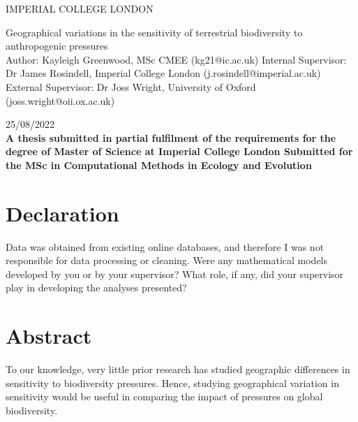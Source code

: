 \documentclass[11pt, a4paper, titlepage]{article}
\begin{document}
    \begin{titlepage}
    \begin{center}
            {\large IMPERIAL COLLEGE LONDON}
    \end{center}
    
    \vspace*{\fill}
    
    \begin{center}
        {\Huge 
    	 Geographical variations in the sensitivity of terrestrial biodiversity to anthropogenic pressures}
        \\[2in]
        Author: Kayleigh Greenwood, MSc CMEE (kg21@ic.ac.uk)
        \bigskip
        \newline
       Internal Supervisor: Dr James Rosindell, Imperial College London (j.rosindell@imperial.ac.uk)
       \bigskip
       \newline
        External Supervisor: Dr Joss Wright, University of Oxford (joss.wright@oii.ox.ac.uk)
        \bigskip
        \newline

        25/08/2022
        \\[2in]
        
        {\bfseries A thesis submitted in partial fulfilment of the requirements for the degree of Master of Science at Imperial College London \newline \newline Submitted for the MSc in Computational Methods in Ecology and Evolution }

        

    
	\end{center}
    \vspace{\fill}
    
    \end{titlepage}
	\section*{Declaration}
	\begin{center}
	Data was obtained from existing online databases, and therefore I was not responsible for data processing or cleaning. \newline
	Were any mathematical models developed by you or by your supervisor? \newline
	What role, if any, did your supervisor play in developing the analyses presented?
	\end{center}
	\newpage
	
	\section*{Abstract}
	 To our knowledge, very little prior research has studied geographic differences in sensitivity to biodiversity pressures. Hence, studying geographical variation in  sensitivity would be useful in comparing the impact of pressures on global biodiversity.
	
\end{document}
